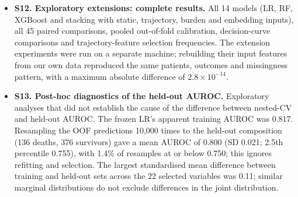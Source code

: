\begin{itemize}
  seeds and the frozen-model specification. All code, aggregate results
  and this manuscript's sources are available at
  \url{https://github.com/hongfangyu123/BMI5101-DN-Mortality-P16};
  patient-level MIMIC-IV data are not included and require credentialed
  PhysioNet access.
\item
  \textbf{S12. Exploratory extensions: complete results.} All 14 models
  (LR, RF, XGBoost and stacking with static, trajectory, burden and
  embedding inputs), all 45 paired comparisons, pooled out-of-fold
  calibration, decision-curve comparisons and trajectory-feature
  selection frequencies. The extension experiments were run on a
  separate machine; rebuilding their input features from our own data
  reproduced the same patients, outcomes and missingness pattern, with a
  maximum absolute difference of \(2.8 \times 10^{-14}\).
\item
  \textbf{S13. Post-hoc diagnostics of the held-out AUROC.} Exploratory
  analyses that did not establish the cause of the difference between
  nested-CV and held-out AUROC. The frozen LR's apparent training AUROC
  was 0.817. Resampling the OOF predictions 10,000 times to the held-out
  composition (136 deaths, 376 survivors) gave a mean AUROC of 0.800 (SD
  0.021; 2.5th percentile 0.755), with 1.4\% of resamples at or below
  0.750; this ignores refitting and selection. The largest standardised
  mean difference between training and held-out sets across the 22
  selected variables was 0.11; similar marginal distributions do not
  exclude differences in the joint distribution.
\end{itemize}
